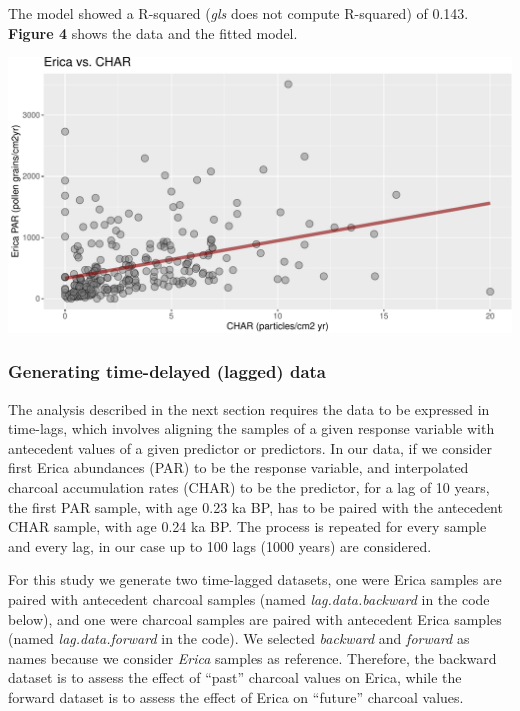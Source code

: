 \documentclass[
]{article}
\let\origfigure\figure
\let\endorigfigure\endfigure
\renewenvironment{figure}[1][2] {
    \expandafter\origfigure\expandafter[H]
} {
    \endorigfigure
}
\begin{document}
\normalsize

The model showed a R-squared (\emph{gls} does not compute R-squared) of
0.143. \textbf{Figure 4} shows the data and the fitted model.

\begin{figure}
\centering
\includegraphics{Workflow_files/figure-latex/unnamed-chunk-9-1.pdf}
\caption{Erica abundances paired with synchronous samples of charcoal
accumulation rate. Straight line shows the fit of the GLS model shown
above.}
\end{figure}

\hypertarget{generating-time-delayed-lagged-data}{%
\subsubsection{Generating time-delayed (lagged)
data}\label{generating-time-delayed-lagged-data}}

The analysis described in the next section requires the data to be
expressed in time-lags, which involves aligning the samples of a given
response variable with antecedent values of a given predictor or
predictors. In our data, if we consider first Erica abundances (PAR) to
be the response variable, and interpolated charcoal accumulation rates
(CHAR) to be the predictor, for a lag of 10 years, the first PAR sample,
with age 0.23 ka BP, has to be paired with the antecedent CHAR sample,
with age 0.24 ka BP. The process is repeated for every sample and every
lag, in our case up to 100 lags (1000 years) are considered.

For this study we generate two time-lagged datasets, one were Erica
samples are paired with antecedent charcoal samples (named
\emph{lag.data.backward} in the code below), and one were charcoal
samples are paired with antecedent Erica samples (named
\emph{lag.data.forward} in the code). We selected \emph{backward} and
\emph{forward} as names because we consider \emph{Erica} samples as
reference. Therefore, the backward dataset is to assess the effect of
``past'' charcoal values on Erica, while the forward dataset is to
assess the effect of Erica on ``future'' charcoal values.
\end{document}
